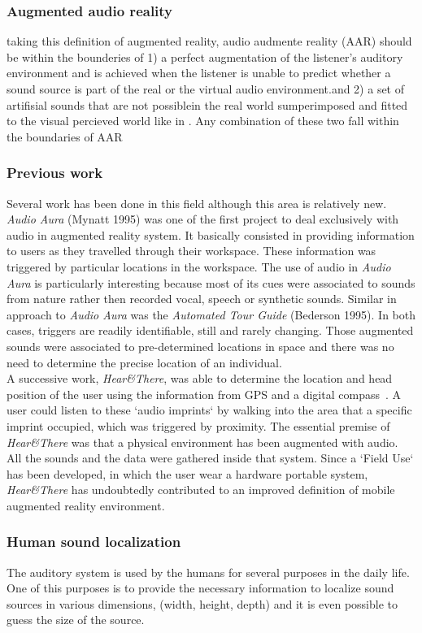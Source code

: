 \documentclass[journal]{IEEEtran}
\begin{document}
\subsubsection{Augmented audio reality}
taking this definition of augmented reality, audio audmente reality (AAR) should be within the bounderies of 1) a perfect augmentation of the listener's auditory environment and is achieved when the listener is unable to predict whether a sound source is part of the real or the virtual audio environment.and 2) a set of artifisial sounds that are not possiblein the real world sumperimposed and fitted to the visual percieved world like in \cite{}. Any combination of these two fall within the boundaries of AAR

\subsubsection{Previous work}
Several work has been done in this field although this area is relatively new. \emph{Audio Aura} (Mynatt 1995) was one of the first project to deal exclusively with audio in augmented reality system. It basically consisted in providing information to users as they travelled through their workspace. These information was triggered by particular locations in the workspace. The use of audio in \emph{Audio Aura} is particularly interesting because most of its cues were associated to sounds from nature rather then recorded vocal, speech or synthetic sounds. Similar in approach to \emph{Audio Aura} was the \emph{Automated Tour Guide} (Bederson 1995). In both cases, triggers are readily identifiable, still and rarely changing. Those augmented sounds were associated to pre-determined locations in space and there was no need to determine the precise location of an individual. \\
A successive work, \emph{Hear\&There}, was able to determine the location and head position of the user using the information from GPS and a digital compass~\cite{}. A user could listen to these `audio imprints` by walking into the area that a specific imprint occupied, which was triggered by proximity. The essential premise of  \emph{Hear\&There} was that a physical environment has been augmented with audio. All the sounds and the data were gathered inside that system. Since a `Field Use` has been developed, in which the user wear a hardware portable system, \emph{Hear\&There} has undoubtedly contributed to an improved definition of mobile augmented reality environment.

\subsubsection{Human sound localization}
The auditory system is used by the humans for several purposes in the daily life. One of this purposes is to provide the necessary information to localize sound sources in various dimensions, (width, height, depth) and it is even possible to guess the size of the source.\\
\end{document}
